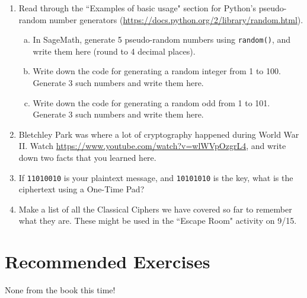 \documentclass[12pt]{amsart}
\theoremstyle{plain}
\theoremstyle{definition}
\begin{document}
\begin{enumerate}[1.]
	\item Read through the ``Examples of basic usage" section for Python's pseudo-random number generators (\url{https://docs.python.org/2/library/random.html}).
	\begin{enumerate}[a.]
		\item In SageMath, generate 5 pseudo-random numbers using \texttt{random()}, and write them here (round to 4 decimal places).
			\begin{framed}
			\vspace{1in}
			\end{framed}
		\item Write down the code for generating a random integer from 1 to 100.  Generate 3 such numbers and write them here.
			\begin{framed}
			\vspace{1in}
			\end{framed}
		\newpage \item Write down the code for generating a random odd from 1 to 101.  Generate 3 such numbers and write them here.
			\begin{framed}
			\vspace{1in}
			\end{framed}
	\end{enumerate}
	\item Bletchley Park was where a lot of cryptography happened during World War II.  Watch \url{https://www.youtube.com/watch?v=wlWVpOzgrL4}, and write down two facts that you learned here.
	\begin{framed}
	\vspace{3in}
	\end{framed}
	\item If \texttt{11010010} is your plaintext message, and \texttt{10101010} is the key, what is the ciphertext using a One-Time Pad? 
	\begin{framed}
	\vspace{2in}
	\end{framed}
	\newpage \item Make a list of all the Classical Ciphers we have covered so far to remember what they are.  These might be used in the ``Escape Room" activity on 9/15.
	\begin{framed}
	\vspace{4in}
	\end{framed}
\end{enumerate}

\section{Recommended Exercises}
\noindent None from the book this time!

	
\end{document}
